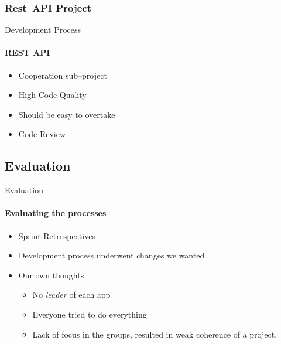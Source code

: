 	\subsubsection{Rest--API Project}
		\begin{frame}[t]{Development Process}\framesubtitle{REST API}
	
    \begin{itemize}
        \item Cooperation sub--project
        \item High Code Quality
        \item Should be easy to overtake
        \item Code Review
    \end{itemize}
	\end{frame}

	\subsection{Evaluation}
		\begin{frame}[t]{Evaluation}\framesubtitle{Evaluating the processes}
	
    \begin{itemize}
        \item Sprint Retrospectives
        \item Development process underwent changes we wanted
        \item Our own thoughts
        	\begin{itemize}
        		\item No \textit{leader} of each app
        		\item Everyone tried to do everything
        		\item Lack of focus in the groups, resulted in weak coherence of a project.
        	\end{itemize}
    \end{itemize}
	\end{frame}